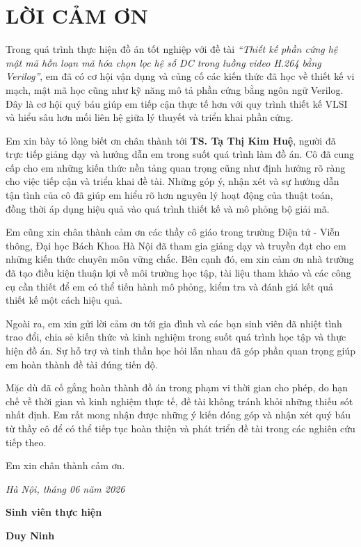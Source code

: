 %
\clearpage
\section*{LỜI CẢM ƠN}

Trong quá trình thực hiện đồ án tốt nghiệp với đề tài \textit{“Thiết kế phần cứng hệ mật mã hỗn loạn mã hóa chọn lọc hệ số DC trong luồng video H.264 bằng Verilog”}, em đã có cơ hội vận dụng và củng cố các kiến thức đã học về thiết kế vi mạch, mật mã học cũng như kỹ năng mô tả phần cứng bằng ngôn ngữ Verilog. Đây là cơ hội quý báu giúp em tiếp cận thực tế hơn với quy trình thiết kế VLSI và hiểu sâu hơn mối liên hệ giữa lý thuyết và triển khai phần cứng.

Em xin bày tỏ lòng biết ơn chân thành tới \textbf{TS. Tạ Thị Kim Huệ}, người đã trực tiếp giảng dạy và hướng dẫn em trong suốt quá trình làm đồ án. Cô đã cung cấp cho em những kiến thức nền tảng quan trọng cũng như định hướng rõ ràng cho việc tiếp cận và triển khai đề tài. Những góp ý, nhận xét và sự hướng dẫn tận tình của cô đã giúp em hiểu rõ hơn nguyên lý hoạt động của thuật toán, đồng thời áp dụng hiệu quả vào quá trình thiết kế và mô phỏng bộ giải mã.

Em cũng xin chân thành cảm ơn các thầy cô giáo trong trường Điện tử - Viễn thông, Đại học Bách Khoa Hà Nội đã tham gia giảng dạy và truyền đạt cho em những kiến thức chuyên môn vững chắc. Bên cạnh đó, em xin cảm ơn nhà trường đã tạo điều kiện thuận lợi về môi trường học tập, tài liệu tham khảo và các công cụ cần thiết để em có thể tiến hành mô phỏng, kiểm tra và đánh giá kết quả thiết kế một cách hiệu quả.

Ngoài ra, em xin gửi lời cảm ơn tới gia đình và các bạn sinh viên đã nhiệt tình trao đổi, chia sẻ kiến thức và kinh nghiệm trong suốt quá trình học tập và thực hiện đồ án. Sự hỗ trợ và tinh thần học hỏi lẫn nhau đã góp phần quan trọng giúp em hoàn thành đề tài đúng tiến độ.

Mặc dù đã cố gắng hoàn thành đồ án trong phạm vi thời gian cho phép, do hạn chế về thời gian và kinh nghiệm thực tế, đề tài không tránh khỏi những thiếu sót nhất định. Em rất mong nhận được những ý kiến đóng góp và nhận xét quý báu từ thầy cô để có thể tiếp tục hoàn thiện và phát triển đề tài trong các nghiên cứu tiếp theo.

Em xin chân thành cảm ơn.

\begin{flushright}
	\textit{Hà Nội, tháng 06 năm 2026}
	
	\textbf{Sinh viên thực hiện}
	
	\vspace{1.5cm}
	\textbf{Duy Ninh}
\end{flushright}

\clearpage